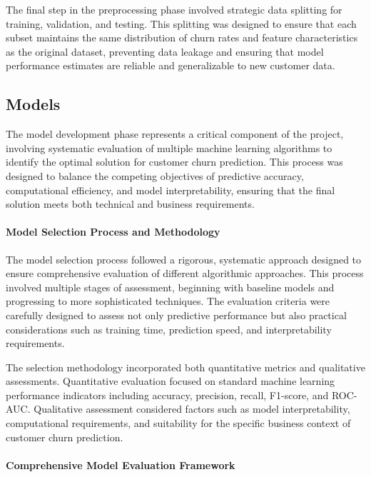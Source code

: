\documentclass{article}
\begin{document}
The final step in the preprocessing phase involved strategic data splitting for training, validation, and testing. This splitting was designed to ensure that each subset maintains the same distribution of churn rates and feature characteristics as the original dataset, preventing data leakage and ensuring that model performance estimates are reliable and generalizable to new customer data.

\subsection{Models}

The model development phase represents a critical component of the project, involving systematic evaluation of multiple machine learning algorithms to identify the optimal solution for customer churn prediction. This process was designed to balance the competing objectives of predictive accuracy, computational efficiency, and model interpretability, ensuring that the final solution meets both technical and business requirements.

\paragraph{Model Selection Process and Methodology}

The model selection process followed a rigorous, systematic approach designed to ensure comprehensive evaluation of different algorithmic approaches. This process involved multiple stages of assessment, beginning with baseline models and progressing to more sophisticated techniques. The evaluation criteria were carefully designed to assess not only predictive performance but also practical considerations such as training time, prediction speed, and interpretability requirements.

The selection methodology incorporated both quantitative metrics and qualitative assessments. Quantitative evaluation focused on standard machine learning performance indicators including accuracy, precision, recall, F1-score, and ROC-AUC. Qualitative assessment considered factors such as model interpretability, computational requirements, and suitability for the specific business context of customer churn prediction.

\paragraph{Comprehensive Model Evaluation Framework}
\end{document}
